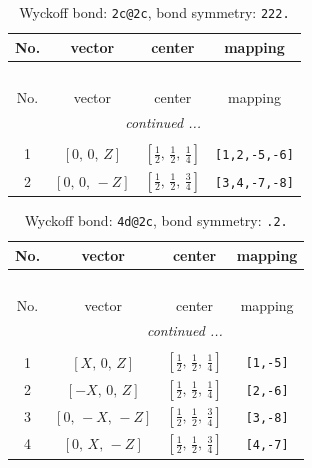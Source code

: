\documentclass[fleqn,8pt]{jsarticle}
\begin{document}
\begin{longtable}{cccc}
\caption{Wyckoff bond: {\tt 2c@2c}, bond symmetry: {\tt 222.}}
 \\
 \hline \hline
No. & vector & center & mapping \\ \hline \endfirsthead

\multicolumn{3}{l}{\tablename\ \thetable{}} \\
 \hline \hline
No. & vector & center & mapping \\ \hline \endhead

 \hline \hline
\multicolumn{3}{r}{\footnotesize\it continued ...} \\ \endfoot

 \hline \hline
\multicolumn{3}{r}{} \\ \endlastfoot

1 & $\left[ 0,\, 0,\, Z \right]$ & $\left[ \frac{1}{2},\, \frac{1}{2},\, \frac{1}{4} \right]$ & {\tt [1,2,-5,-6]} \\ \hline
2 & $\left[ 0,\, 0,\, - Z \right]$ & $\left[ \frac{1}{2},\, \frac{1}{2},\, \frac{3}{4} \right]$ & {\tt [3,4,-7,-8]} \\
\end{longtable}
\renewcommand{\arraystretch}{1.2}
\begin{longtable}{cccc}
\caption{Wyckoff bond: {\tt 4d@2c}, bond symmetry: {\tt .2.}}
 \\
 \hline \hline
No. & vector & center & mapping \\ \hline \endfirsthead

\multicolumn{3}{l}{\tablename\ \thetable{}} \\
 \hline \hline
No. & vector & center & mapping \\ \hline \endhead

 \hline \hline
\multicolumn{3}{r}{\footnotesize\it continued ...} \\ \endfoot

 \hline \hline
\multicolumn{3}{r}{} \\ \endlastfoot

1 & $\left[ X,\, 0,\, Z \right]$ & $\left[ \frac{1}{2},\, \frac{1}{2},\, \frac{1}{4} \right]$ & {\tt [1,-5]} \\ \hline
2 & $\left[ - X,\, 0,\, Z \right]$ & $\left[ \frac{1}{2},\, \frac{1}{2},\, \frac{1}{4} \right]$ & {\tt [2,-6]} \\ \hline
3 & $\left[ 0,\, - X,\, - Z \right]$ & $\left[ \frac{1}{2},\, \frac{1}{2},\, \frac{3}{4} \right]$ & {\tt [3,-8]} \\ \hline
4 & $\left[ 0,\, X,\, - Z \right]$ & $\left[ \frac{1}{2},\, \frac{1}{2},\, \frac{3}{4} \right]$ & {\tt [4,-7]} \\
\end{longtable}
\end{document}
